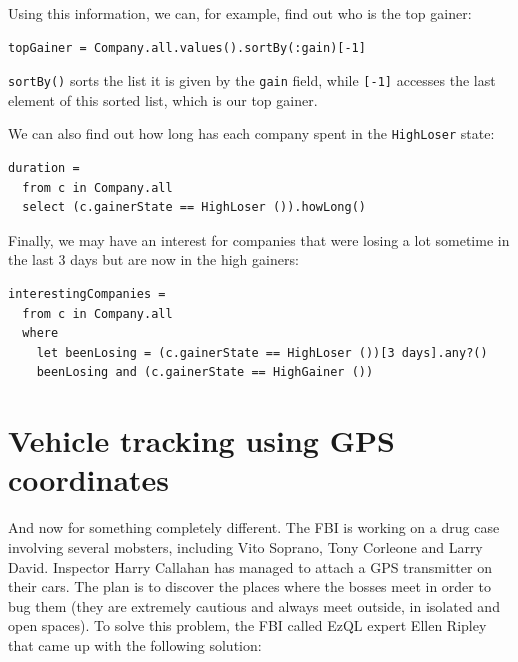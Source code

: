 Using this information, we can, for example, find out who is the top
gainer:

\begin{lstlisting}
topGainer = Company.all.values().sortBy(:gain)[-1]
\end{lstlisting}

\verb=sortBy()= sorts the list it is given by the \verb=gain= field,
while \verb=[-1]= accesses the last element of this sorted list, which
is our top gainer.

We can also find out how long has each company spent in the
\verb=HighLoser= state:

\begin{lstlisting}
duration =
  from c in Company.all
  select (c.gainerState == HighLoser ()).howLong()
\end{lstlisting}

Finally, we may have an interest for companies that were losing a lot
sometime in the last 3 days but are now in the high gainers:

\begin{lstlisting}
interestingCompanies =
  from c in Company.all
  where
    let beenLosing = (c.gainerState == HighLoser ())[3 days].any?()
    beenLosing and (c.gainerState == HighGainer ())
\end{lstlisting}

\section{Vehicle tracking using GPS coordinates}

And now for something completely different. The FBI is working on a
drug case involving several mobsters, including Vito Soprano, Tony
Corleone and Larry David. Inspector Harry Callahan has managed to
attach a GPS transmitter on their cars. The plan is to discover the
places where the bosses meet in order to bug them (they are extremely
cautious and always meet outside, in isolated and open spaces). To
solve this problem, the FBI called EzQL expert Ellen Ripley that came
up with the following solution:

